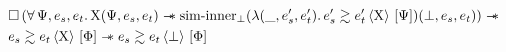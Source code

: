 
\begin{theorem}
    \begin{align*}
            &
            \iPersistent \left(
                \forall \iPredTwo, \datalangExpr_s, \datalangExpr_t \ldotp
                \iProt (\iPredTwo, \datalangExpr_s, \datalangExpr_t) \iSepImp
                \mathrm{sim \mathhyphen inner}_\bot (\lambdaAbs (\_, \datalangExpr_s', \datalangExpr_t') \ldotp \iSim[\iProt]{\iPredTwo}{\datalangExpr_s'}{\datalangExpr_t'}) (\bot, \datalangExpr_s, \datalangExpr_t)
            \right) \iSepImp
        \\
            &
            \iSim[\iProt]{\iPred}{\datalangExpr_s}{\datalangExpr_t} \iSepImp
            \iSim[\bot]{\iPred}{\datalangExpr_s}{\datalangExpr_t}
    \end{align*}
\end{theorem}

